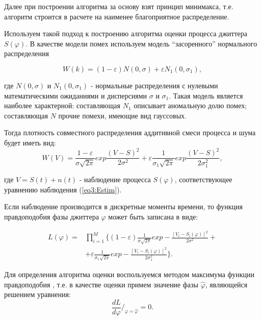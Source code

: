 Далее при построении алгоритма за основу взят принцип минимакса, т.е. алгоритм строится в расчете на наименее благоприятное распределение.

Используем такой подход к построению алгоритма оценки процесса джиттера $S(\varphi)$. 
В качестве модели помех используем модель ``засоренного'' нормального распределения

\begin{equation}\label{eq3:kustov}
W(k)=(1-\varepsilon)N(0,\sigma)+\varepsilon N_1(0,\sigma_1),
\end{equation}

\noindent где $N(0,\sigma)$ и $N_1(0,\sigma_1)$ - нормальные распределения с нулевыми математическими ожиданиями и дисперсиями $\sigma$ и $\sigma_1$. 
Такая модель является наиболее характерной: составляющая $N_1$ описывает аномальную долю помех; составляющая $N$ прочие помехи, имеющие вид гауссовых.

Тогда плотность совместного распределения аддитивной смеси процесса и шума будет иметь вид:
\begin{equation}\label{eq3:kustov1}
W(V)=\frac{1-\varepsilon}{\sigma \sqrt{2\pi}}exp\frac{(V-S)^2}{2\sigma^2}+\varepsilon\frac{1}{\sigma_1\sqrt{2\pi}}exp\frac{(V-S)^2}{2\sigma_1^2},
\end{equation}

\noindent где $V=S(t)+n(t)$ - наблюдение процесса $S(\varphi)$, соответствующее уравнению наблюдения (\ref{eq3:Estim}).

Если наблюдение производится в дискретные моменты времени, то функция правдоподобия фазы джиттера $\varphi$ может быть записана в виде:

\begin{equation}\label{eq3:kustov2}
\begin{split}
L(\varphi)=&\prod_{i=1}^M \{(1-\varepsilon)\frac{1}{\sigma\sqrt{2\pi}}exp-\frac{[V_i-S_i(\varphi)]^2}{2\sigma^2}+\\
&+\varepsilon\frac{1}{\sigma_1\sqrt{2\pi}}exp-\frac{[V_i-S_i(\varphi)]^2}{2\sigma_1^2} \}.
\end{split}
\end{equation}

Для определения алгоритма оценки воспользуемся методом максимума функции правдоподобия \cite{tihonov}, т.е. в качестве оценки примем значение фазы $\hat{\varphi}$, являющейся решением уравнения:
\begin{equation}\label{eq3:kustov3}
\frac{dL}{d\varphi}/_{\varphi=\hat{\varphi}}=0.
\end{equation}

